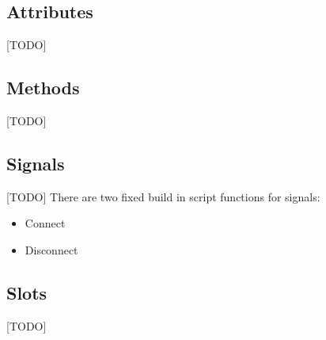 \subsection{Attributes}
[TODO]


\subsection{Methods}
[TODO]


\subsection{Signals}
[TODO]
There are two fixed build in script functions for signals:
\begin{itemize}
\item{Connect}
\item{Disconnect}
\end{itemize}




\subsection{Slots}
[TODO]
